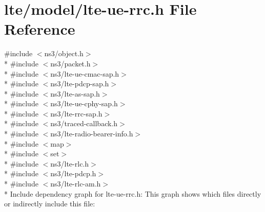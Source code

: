 \hypertarget{lte-ue-rrc_8h}{}\section{lte/model/lte-\/ue-\/rrc.h File Reference}
\label{lte-ue-rrc_8h}
{\ttfamily \#include $<$ns3/object.\+h$>$}\\*
{\ttfamily \#include $<$ns3/packet.\+h$>$}\\*
{\ttfamily \#include $<$ns3/lte-\/ue-\/cmac-\/sap.\+h$>$}\\*
{\ttfamily \#include $<$ns3/lte-\/pdcp-\/sap.\+h$>$}\\*
{\ttfamily \#include $<$ns3/lte-\/as-\/sap.\+h$>$}\\*
{\ttfamily \#include $<$ns3/lte-\/ue-\/cphy-\/sap.\+h$>$}\\*
{\ttfamily \#include $<$ns3/lte-\/rrc-\/sap.\+h$>$}\\*
{\ttfamily \#include $<$ns3/traced-\/callback.\+h$>$}\\*
{\ttfamily \#include $<$ns3/lte-\/radio-\/bearer-\/info.\+h$>$}\\*
{\ttfamily \#include $<$map$>$}\\*
{\ttfamily \#include $<$set$>$}\\*
{\ttfamily \#include $<$ns3/lte-\/rlc.\+h$>$}\\*
{\ttfamily \#include $<$ns3/lte-\/pdcp.\+h$>$}\\*
{\ttfamily \#include $<$ns3/lte-\/rlc-\/am.\+h$>$}\\*
Include dependency graph for lte-\/ue-\/rrc.h\+:
This graph shows which files directly or indirectly include this file\+:
